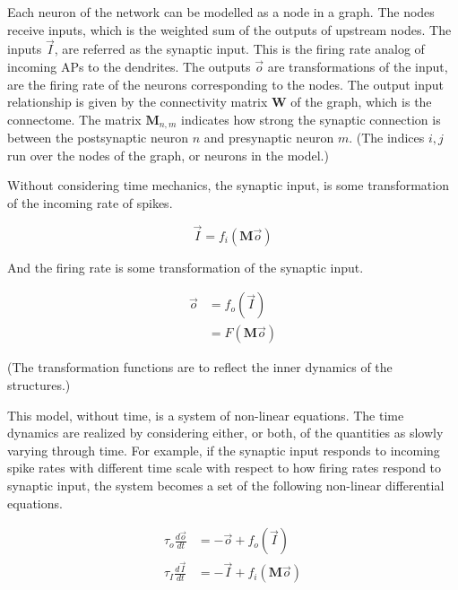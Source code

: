 \documentclass[../dissertation.tex]{subfiles}
\begin{document}
Each neuron of the network can be modelled as a node in a graph.
The nodes receive inputs, which is the weighted sum of the outputs of upstream nodes.
The inputs $\vec{I}$, are referred as the synaptic input.
This is the firing rate analog of incoming APs to the dendrites.
The outputs $\vec{o}$ are transformations of the input, are the firing rate of the neurons corresponding to the nodes.
The output input relationship is given by the connectivity matrix $\mathbf{W}$ of the graph, which is the connectome.
The matrix $\mathbf{M}_{n,m}$ indicates how strong the synaptic connection is between the postsynaptic neuron $n$ and presynaptic neuron $m$.
(The indices $i,j$ run over the nodes of the graph, or neurons in the model.)

Without considering time mechanics, the synaptic input, is some transformation of the incoming rate of spikes.

\begin{equation}
    \vec{I} = f_{i} \left( \mathbf{M} \vec{o} \right)
\end{equation}

And the firing rate is some transformation of the synaptic input.

\begin{equation} \begin{split}
    \vec{o}     & = f_{o} \left(            \vec{I} \right) \\
                & = F     \left( \mathbf{M} \vec{o} \right)
\end{split} \end{equation}

(The transformation functions are to reflect the inner dynamics of the structures.)

This model, without time, is a system of non-linear equations.
The time dynamics are realized by considering either, or both, of the quantities as slowly varying through time.
For example, if the synaptic input responds to incoming spike rates with different time scale with respect to how firing rates respond to synaptic input, the system becomes a set of the following non-linear differential equations.

\begin{equation} \begin{split}
    \tau_{o} \frac{d\vec{o}}{dt} & = -\vec{o} + f_{o} \left( \vec{I} \right) \\
    \tau_{I} \frac{d\vec{I}}{dt} & = -\vec{I} + f_{i} \left( \mathbf{M} \vec{o} \right)
\end{split} \end{equation}
\end{document}
